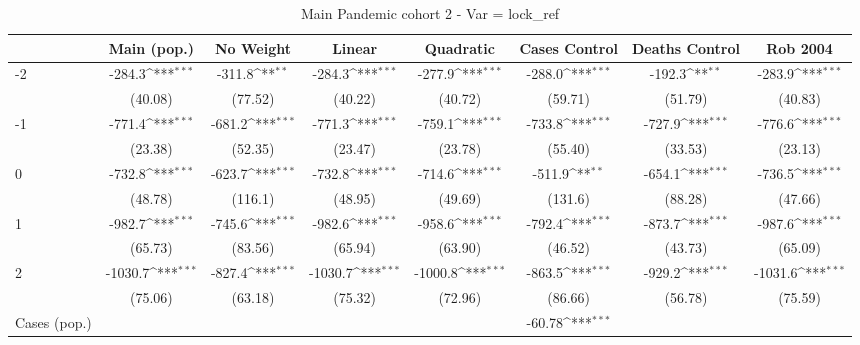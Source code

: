 \documentclass{article}
\begin{document}
{
\def\sym#1{\ifmmode^{#1}\else\(^{#1}\)\fi}
\begin{longtable}{l*{7}{c}}
\caption{Main Pandemic cohort 2 - Var = lock\_ref}\\
\hline\hline\endfirsthead\hline\endhead\hline\endfoot\endlastfoot
                &\multicolumn{1}{c}{Main (pop.)}&\multicolumn{1}{c}{No Weight}&\multicolumn{1}{c}{Linear}&\multicolumn{1}{c}{Quadratic}&\multicolumn{1}{c}{Cases Control}&\multicolumn{1}{c}{Deaths Control}&\multicolumn{1}{c}{Rob 2004}\\
\hline
-2              &   -284.3\sym{***}&   -311.8\sym{**} &   -284.3\sym{***}&   -277.9\sym{***}&   -288.0\sym{***}&   -192.3\sym{**} &   -283.9\sym{***}\\
                &  (40.08)         &  (77.52)         &  (40.22)         &  (40.72)         &  (59.71)         &  (51.79)         &  (40.83)         \\
-1              &   -771.4\sym{***}&   -681.2\sym{***}&   -771.3\sym{***}&   -759.1\sym{***}&   -733.8\sym{***}&   -727.9\sym{***}&   -776.6\sym{***}\\
                &  (23.38)         &  (52.35)         &  (23.47)         &  (23.78)         &  (55.40)         &  (33.53)         &  (23.13)         \\
0               &   -732.8\sym{***}&   -623.7\sym{***}&   -732.8\sym{***}&   -714.6\sym{***}&   -511.9\sym{**} &   -654.1\sym{***}&   -736.5\sym{***}\\
                &  (48.78)         &  (116.1)         &  (48.95)         &  (49.69)         &  (131.6)         &  (88.28)         &  (47.66)         \\
1               &   -982.7\sym{***}&   -745.6\sym{***}&   -982.6\sym{***}&   -958.6\sym{***}&   -792.4\sym{***}&   -873.7\sym{***}&   -987.6\sym{***}\\
                &  (65.73)         &  (83.56)         &  (65.94)         &  (63.90)         &  (46.52)         &  (43.73)         &  (65.09)         \\
2               &  -1030.7\sym{***}&   -827.4\sym{***}&  -1030.7\sym{***}&  -1000.8\sym{***}&   -863.5\sym{***}&   -929.2\sym{***}&  -1031.6\sym{***}\\
                &  (75.06)         &  (63.18)         &  (75.32)         &  (72.96)         &  (86.66)         &  (56.78)         &  (75.59)         \\
Cases (pop.)    &                  &                  &                  &                  &   -60.78\sym{***}&                  &                  \\

\end{longtable}}
\end{document}
